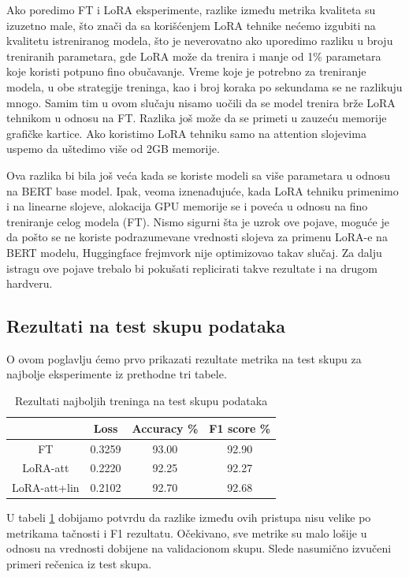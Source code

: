 \documentclass{article}
\theoremstyle{definition}
\begin{document}
	Ako poredimo FT i LoRA eksperimente, razlike između metrika kvaliteta su 
	izuzetno male, što znači da sa korišćenjem LoRA tehnike nećemo izgubiti
	na kvalitetu istreniranog modela, što je neverovatno ako uporedimo razliku
	u broju treniranih parametara, gde LoRA može da trenira i manje od 1\% 
	parametara koje koristi potpuno fino obučavanje. Vreme koje je potrebno za
	treniranje modela, u obe strategije treninga, kao i broj koraka po sekundama
	se ne razlikuju mnogo. Samim tim u ovom slučaju nisamo uočili da se model
	trenira brže LoRA tehnikom u odnosu na FT. Razlika još može da se primeti 
	u zauzeću memorije grafičke kartice. Ako koristimo LoRA tehniku samo na 
	attention slojevima uspemo da uštedimo više od 2GB memorije. 

	Ova razlika bi bila još veća kada se koriste modeli sa više parametara u 
	odnosu na BERT base model. Ipak, veoma iznenađujuće, kada LoRA tehniku 
	primenimo i na linearne slojeve, alokacija GPU memorije se i poveća u odnosu
	na fino treniranje celog modela (FT). Nismo sigurni šta je uzrok ove pojave,
	moguće je da pošto se ne koriste podrazumevane vrednosti slojeva za primenu
	LoRA-e na BERT modelu, Huggingface frejmvork nije optimizovao takav slučaj.
	Za dalju istragu ove pojave trebalo bi pokušati replicirati takve rezultate
	 i na drugom hardveru.

	\subsection{Rezultati na test skupu podataka} \label{test}
	O ovom poglavlju ćemo prvo prikazati rezultate metrika na test skupu za 
	najbolje eksperimente iz prethodne tri tabele. 

	\begin{table}
		\centering
		\begin{tabular}{| c || c | c | c |} 
			\hline
			& Loss & Accuracy \% & F1 score \% \\
			\hline \hline
			FT & 0.3259 & 93.00 & 92.90 \\
			\hline
			LoRA-att & 0.2220 & 92.25 & 92.27 \\
			\hline
			LoRA-att+lin & 0.2102 & 92.70 & 92.68 \\
			\hline
		\end{tabular}
		\caption{\label{test-table} Rezultati najboljih treninga na test skupu podataka}
	\end{table}

	U tabeli \ref{test-table} dobijamo potvrdu da razlike između ovih pristupa
	nisu velike po metrikama tačnosti i F1 rezultatu. Očekivano, sve metrike su
	malo lošije u odnosu na vrednosti dobijene na validacionom skupu. Slede
	nasumično izvučeni primeri rečenica iz test skupa.
\end{document}
